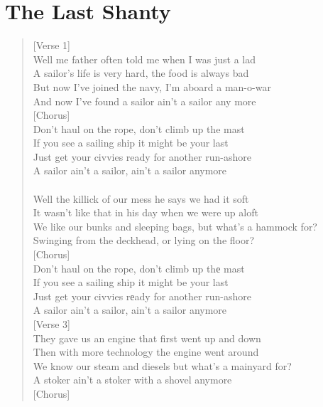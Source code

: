 \documentclass[11pt]{article}
\begin{document}
\section{The Last Shanty}
\label{sec:orgb7cf592}
\begin{verse}
[Verse 1]\\
Well me father often told me when I was just a lad\\
A sailor's life is very hard, the food is always bad\\
But now I've joined the navy, I'm aboard a man-o-war\\
And now I've found a sailor ain't a sailor any more\\
\vspace*{1em}
[Chorus]\\
Don't haul on the rope, don't climb up the mast\\
If you see a sailing ship it might be your last\\
Just get your civvies ready for another run-ashore\\
A sailor ain't a sailor, ain't a sailor anymore\\
[Verse 2]\\
Well the killick of our mess he says we had it soft\\
It wasn't like that in his day when we were up aloft\\
We like our bunks and sleeping bags, but what's a hammock for?\\
Swinging from the deckhead, or lying on the floor?\\
\vspace*{1em}
[Chorus]\\
Don't haul on the rope, don't climb up thе mast\\
If you see a sailing ship it might be your last\\
Just get your civvies rеady for another run-ashore\\
A sailor ain't a sailor, ain't a sailor anymore\\
\vspace*{1em}
[Verse 3]\\
They gave us an engine that first went up and down\\
Then with more technology the engine went around\\
We know our steam and diesels but what's a mainyard for?\\
A stoker ain't a stoker with a shovel anymore\\
\vspace*{1em}
[Chorus]\\

\end{verse}
\end{document}

